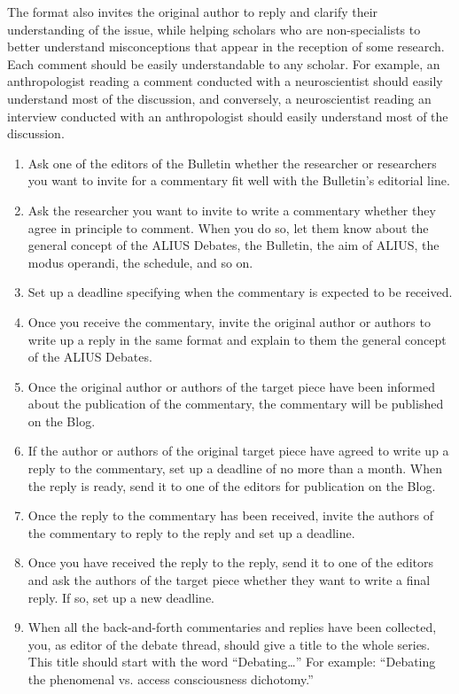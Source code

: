 \documentclass[11pt]{article}
\begin{document}
The format also invites the original author to reply and clarify their understanding of the issue, while helping scholars who are non-specialists to better understand misconceptions that appear in the reception of some research. Each comment should be easily understandable to any scholar. For example, an anthropologist reading a comment conducted with a neuroscientist should easily understand most of the discussion, and conversely, a neuroscientist reading an interview conducted with an anthropologist should easily understand most of the discussion.


\begin{enumerate}
\item Ask one of the editors of the Bulletin whether the researcher or researchers you want to invite for a commentary fit well with the Bulletin's editorial line.
\item Ask the researcher you want to invite to write a commentary whether they agree in principle to comment. When you do so, let them know about the general concept of the ALIUS Debates, the Bulletin, the aim of ALIUS, the modus operandi, the schedule, and so on.
\item Set up a deadline specifying when the commentary is expected to be received.
\item Once you receive the commentary, invite the original author or authors to write up a reply in the same format and explain to them the general concept of the ALIUS Debates.
\item Once the original author or authors of the target piece have been informed about the publication of the commentary, the commentary will be published on the Blog.
\item If the author or authors of the original target piece have agreed to write up a reply to the commentary, set up a deadline of no more than a month. When the reply is ready, send it to one of the editors for publication on the Blog.
\item Once the reply to the commentary has been received, invite the authors of the commentary to reply to the reply and set up a deadline.
\item Once you have received the reply to the reply, send it to one of the editors and ask the authors of the target piece whether they want to write a final reply. If so, set up a new deadline.
\item When all the back-and-forth commentaries and replies have been collected, you, as editor of the debate thread, should give a title to the whole series. This title should start with the word ``Debating\ldots'' For example: ``Debating the phenomenal vs. access consciousness dichotomy.''

\end{enumerate}
\end{document}
